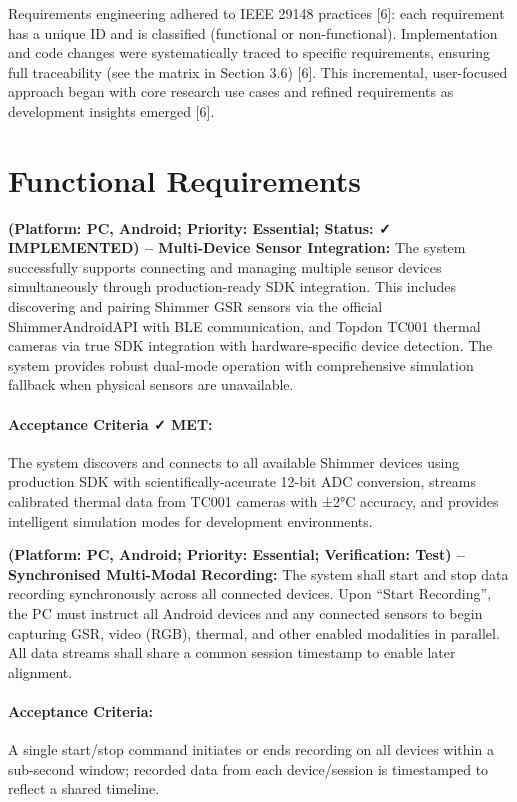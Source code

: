 Requirements engineering adhered to IEEE 29148 practices [6]: each requirement has a unique ID and is classified (functional or non-functional). Implementation and code changes were systematically traced to specific requirements, ensuring full traceability (see the matrix in Section 3.6) [6]. This incremental, user-focused approach began with core research use cases and refined requirements as development insights emerged [6].


\section{Functional Requirements}

\begin{description}[style=unboxed,leftmargin=0cm]
    \item[\textbf{FR1}] \textbf{(Platform: PC, Android; Priority: Essential; Status: ✓ IMPLEMENTED) – Multi-Device Sensor Integration:} The system successfully supports connecting and managing multiple sensor devices simultaneously through production-ready SDK integration. This includes discovering and pairing Shimmer GSR sensors via the official ShimmerAndroidAPI with BLE communication, and Topdon TC001 thermal cameras via true SDK integration with hardware-specific device detection. The system provides robust dual-mode operation with comprehensive simulation fallback when physical sensors are unavailable.

    \paragraph{Acceptance Criteria ✓ MET:} The system discovers and connects to all available Shimmer devices using production SDK with scientifically-accurate 12-bit ADC conversion, streams calibrated thermal data from TC001 cameras with ±2°C accuracy, and provides intelligent simulation modes for development environments.

    \item[\textbf{FR2}] \textbf{(Platform: PC, Android; Priority: Essential; Verification: Test) – Synchronised Multi-Modal Recording:} The system shall start and stop data recording synchronously across all connected devices. Upon “Start Recording”, the PC must instruct all Android devices and any connected sensors to begin capturing GSR, video (RGB), thermal, and other enabled modalities in parallel. All data streams shall share a common session timestamp to enable later alignment.

    \paragraph{Acceptance Criteria:} A single start/stop command initiates or ends recording on all devices within a sub-second window; recorded data from each device/session is timestamped to reflect a shared timeline.


\end{description}
